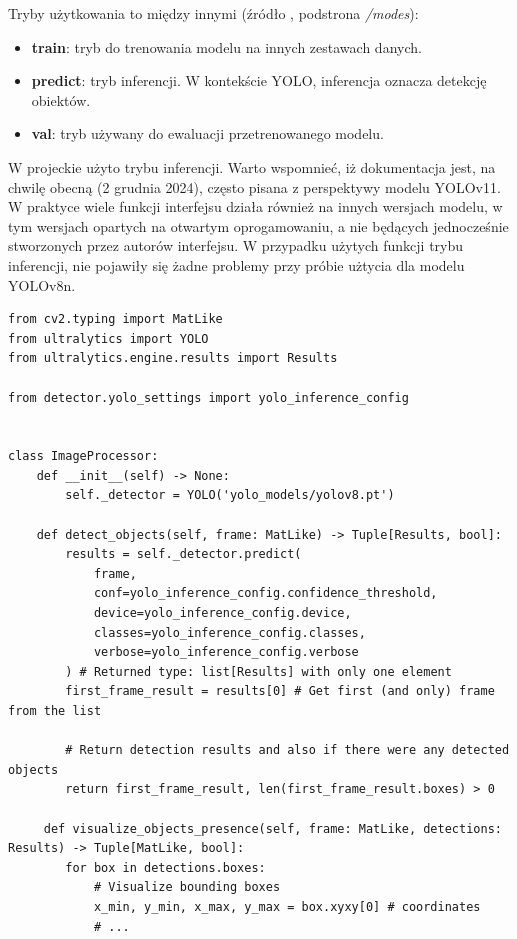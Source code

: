 Tryby użytkowania to między innymi (źródło \cite{yolo_docs}, podstrona \emph{/modes}):
\begin{itemize}
    \item \textbf{train}: tryb do trenowania modelu na innych zestawach danych.
    \item \textbf{predict}: tryb inferencji. W kontekście YOLO, inferencja oznacza detekcję obiektów.
    \item \textbf{val}: tryb używany do ewaluacji przetrenowanego modelu.
\end{itemize}

W projeckie użyto trybu inferencji. Warto wspomnieć, iż dokumentacja \cite{yolo_docs} jest, na chwilę obecną (2 grudnia 2024), często pisana z perspektywy modelu YOLOv11. W praktyce wiele funkcji interfejsu działa również na innych wersjach modelu, w tym wersjach opartych na otwartym oprogamowaniu, a nie będących jednocześnie stworzonych przez autorów interfejsu. W przypadku użytych funkcji trybu inferencji, nie pojawiły się żadne problemy przy próbie użtycia dla modelu YOLOv8n. 


\begin{lstlisting}[caption={Użycie trybu inferencji na przykładzie własnego kodu źródłowego.}, label={lst:inference_interface}]
from cv2.typing import MatLike
from ultralytics import YOLO
from ultralytics.engine.results import Results

from detector.yolo_settings import yolo_inference_config


class ImageProcessor:
    def __init__(self) -> None:
        self._detector = YOLO('yolo_models/yolov8.pt')

    def detect_objects(self, frame: MatLike) -> Tuple[Results, bool]:
        results = self._detector.predict(
            frame,
            conf=yolo_inference_config.confidence_threshold,
            device=yolo_inference_config.device,
            classes=yolo_inference_config.classes,
            verbose=yolo_inference_config.verbose
        ) # Returned type: list[Results] with only one element
        first_frame_result = results[0] # Get first (and only) frame from the list

        # Return detection results and also if there were any detected objects
        return first_frame_result, len(first_frame_result.boxes) > 0 

     def visualize_objects_presence(self, frame: MatLike, detections: Results) -> Tuple[MatLike, bool]:
        for box in detections.boxes:
            # Visualize bounding boxes
            x_min, y_min, x_max, y_max = box.xyxy[0] # coordinates
            # ...
\end{lstlisting}

